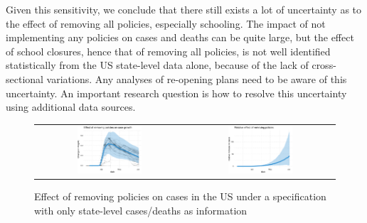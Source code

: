 \documentclass[11pt,reqno,letter]{amsart}
\theoremstyle{definition}
\begin{document}
Given this sensitivity, we conclude that there still exists a lot of uncertainty as to the effect of removing all policies, especially schooling. The impact of not implementing any policies on cases and deaths can be quite large, but  the effect of school closures, hence that of removing all policies, is not well identified statistically from the US state-level data alone, because of the lack of cross-sectional variations.  Any analyses of re-opening plans need to be aware of this uncertainty.  An important research question is how to resolve this uncertainty using additional data sources.

\begin{figure}[ht]
  \caption{Effect of removing policies on cases in the US under a specification with only state-level cases/deaths as information \label{fig:US-nop-SI}}
  \begin{minipage}{\linewidth}
    \centering
    \begin{tabular}{cc}
      \includegraphics[width=0.45\textwidth]{tables_and_figures/us-nop-dgrowth_v1}
      &
        \includegraphics[width=0.45\textwidth]{tables_and_figures/us-nop-rel_v1}
    \end{tabular}
  \end{minipage}
\end{figure}
\end{document}
